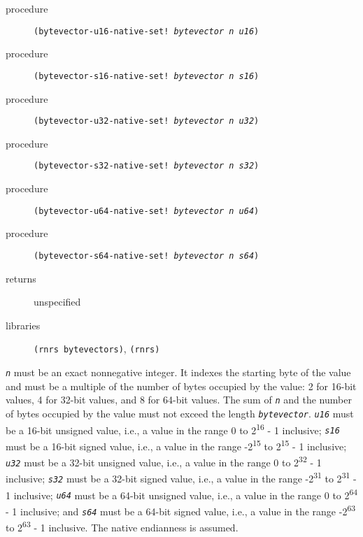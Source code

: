 \begin{description}

\label{objects_s255}\item[procedure] \texttt{(bytevector-u16-native-set! \textit{bytevector} \textit{n} \textit{u16})}



\item[procedure] \texttt{(bytevector-s16-native-set! \textit{bytevector} \textit{n} \textit{s16})}



\item[procedure] \texttt{(bytevector-u32-native-set! \textit{bytevector} \textit{n} \textit{u32})}



\item[procedure] \texttt{(bytevector-s32-native-set! \textit{bytevector} \textit{n} \textit{s32})}



\item[procedure] \texttt{(bytevector-u64-native-set! \textit{bytevector} \textit{n} \textit{u64})}



\item[procedure] \texttt{(bytevector-s64-native-set! \textit{bytevector} \textit{n} \textit{s64})}



\item[returns] unspecified


\item[libraries] \texttt{(rnrs bytevectors)}, \texttt{(rnrs)}
\end{description}

\texttt{\textit{n}} must be an exact nonnegative integer.
It indexes the starting byte of the value and must be a multiple of the
number of bytes occupied by the value: 2 for 16-bit values, 4 for 32-bit
values, and 8 for 64-bit values.
The sum of \texttt{\textit{n}} and the number of bytes occupied by the value must
not exceed the length \texttt{\textit{bytevector}}.
\texttt{\textit{u16}} must be a 16-bit unsigned value, i.e., a value in the range
0 to 2\textsuperscript{16} - 1 inclusive;
\texttt{\textit{s16}} must be a 16-bit signed value, i.e., a value in the range
-2\textsuperscript{15} to 2\textsuperscript{15} - 1 inclusive;
\texttt{\textit{u32}} must be a 32-bit unsigned value, i.e., a value in the range
0 to 2\textsuperscript{32} - 1 inclusive;
\texttt{\textit{s32}} must be a 32-bit signed value, i.e., a value in the range
-2\textsuperscript{31} to 2\textsuperscript{31} - 1 inclusive;
\texttt{\textit{u64}} must be a 64-bit unsigned value, i.e., a value in the range
0 to 2\textsuperscript{64} - 1 inclusive; and
\texttt{\textit{s64}} must be a 64-bit signed value, i.e., a value in the range
-2\textsuperscript{63} to 2\textsuperscript{63} - 1 inclusive.
The native endianness is assumed.

